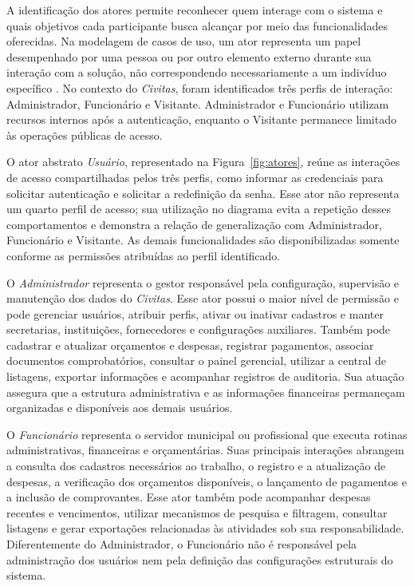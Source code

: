 A identificação dos atores permite reconhecer quem interage com o sistema e quais objetivos cada participante busca alcançar por meio das funcionalidades oferecidas. Na modelagem de casos de uso, um ator representa um papel desempenhado por uma pessoa ou por outro elemento externo durante sua interação com a solução, não correspondendo necessariamente a um indivíduo específico \parencite{Guedes2018}. No contexto do \textit{Civitas}, foram identificados três perfis de interação: Administrador, Funcionário e Visitante. Administrador e Funcionário utilizam recursos internos após a autenticação, enquanto o Visitante permanece limitado às operações públicas de acesso.

O ator abstrato \textit{Usuário}, representado na Figura~\ref{fig:atores}, reúne as interações de acesso compartilhadas pelos três perfis, como informar as credenciais para solicitar autenticação e solicitar a redefinição da senha. Esse ator não representa um quarto perfil de acesso; sua utilização no diagrama evita a repetição desses comportamentos e demonstra a relação de generalização com Administrador, Funcionário e Visitante. As demais funcionalidades são disponibilizadas somente conforme as permissões atribuídas ao perfil identificado.

O \textit{Administrador} representa o gestor responsável pela configuração, supervisão e manutenção dos dados do \textit{Civitas}. Esse ator possui o maior nível de permissão e pode gerenciar usuários, atribuir perfis, ativar ou inativar cadastros e manter secretarias, instituições, fornecedores e configurações auxiliares. Também pode cadastrar e atualizar orçamentos e despesas, registrar pagamentos, associar documentos comprobatórios, consultar o painel gerencial, utilizar a central de listagens, exportar informações e acompanhar registros de auditoria. Sua atuação assegura que a estrutura administrativa e as informações financeiras permaneçam organizadas e disponíveis aos demais usuários.

O \textit{Funcionário} representa o servidor municipal ou profissional que executa rotinas administrativas, financeiras e orçamentárias. Suas principais interações abrangem a consulta dos cadastros necessários ao trabalho, o registro e a atualização de despesas, a verificação dos orçamentos disponíveis, o lançamento de pagamentos e a inclusão de comprovantes. Esse ator também pode acompanhar despesas recentes e vencimentos, utilizar mecanismos de pesquisa e filtragem, consultar listagens e gerar exportações relacionadas às atividades sob sua responsabilidade. Diferentemente do Administrador, o Funcionário não é responsável pela administração dos usuários nem pela definição das configurações estruturais do sistema.

